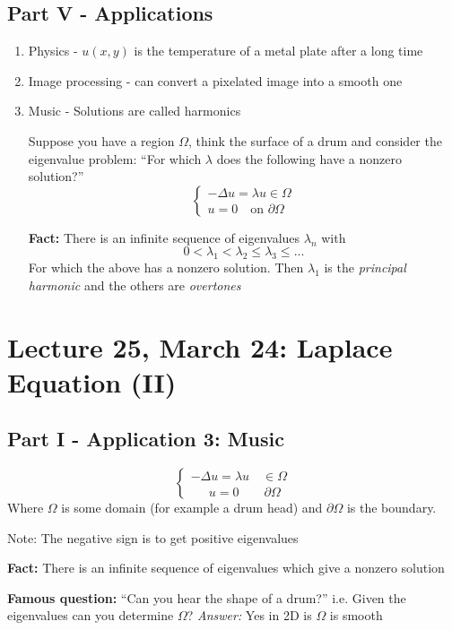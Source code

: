 \documentclass[12pt]{article}
\begin{document}
\subsection*{Part V - Applications}
\begin{enumerate}
    \item Physics - $u(x, y)$ is the temperature of a metal plate after a long time
    \item Image processing - can convert a pixelated image into a smooth one
    \item Music - Solutions are called harmonics 
    
    Suppose you have a region $\Omega$, think the surface of a drum and consider the eigenvalue problem: ``For which $\lambda$ does the following have a nonzero solution?''
    \[\begin{cases}
        -\Delta u = \lambda u \in \Omega\\
        u = 0 \quad \text{on } \partial \Omega
    \end{cases}\]

    \textbf{Fact:} There is an infinite sequence of eigenvalues $\lambda_n$ with 
    \[0 < \lambda_1 < \lambda_2 \leq \lambda_3 \leq ...\]
    For which the above has a nonzero solution. Then $\lambda_1$ is the \emph{principal harmonic} and the others are \emph{overtones}
\end{enumerate}

\section*{Lecture 25, March 24: Laplace Equation (II)}
\subsection*{Part I - Application 3: Music}
\[\begin{cases}
    -\Delta u = \lambda u \quad \in \Omega\\
    \quad \;\, u = 0 \qquad  \partial \Omega 
\end{cases}\]
Where $\Omega$ is some domain (for example a drum head) and $\partial \Omega$ is the boundary.

Note: The negative sign is to get positive eigenvalues

\textbf{Fact:} There is an infinite sequence of eigenvalues which give a nonzero solution 

\textbf{Famous question:} ``Can you hear the shape of a drum?'' i.e. Given the eigenvalues can you determine $\Omega$?
\emph{Answer:} Yes in 2D is $\Omega$ is smooth
\end{document}
